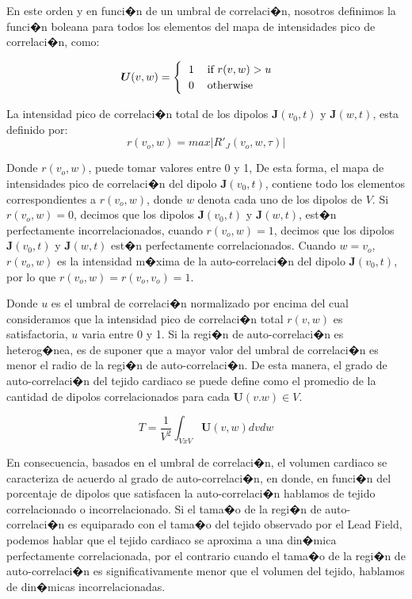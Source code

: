 En este orden y en funci�n de un umbral de correlaci�n, nosotros definimos la funci�n boleana para todos los elementos del mapa de intensidades pico de correlaci�n, como:
 
\begin{equation}
 \boldsymbol{U}(v,w)=
 \begin{cases}
    \begin{tabular}{ll}
        ${1}$ & if ${r}(v,w) > {u}$\\
        ${0}$ & otherwise
    \end{tabular}
 \end{cases}
\end{equation}

 La intensidad pico de correlaci�n total de los  dipolos  $\mathbf{J}(v_0,t)$ y $\mathbf{J}(w,t)$, esta definido por: 
\begin{equation}
{r}(v_o,w)  =max{|{R'_{J}}(v_o,w,\tau)|}
\end{equation}

Donde ${r}(v_o,w)$, puede tomar valores entre 0 y 1, De esta forma, el mapa de intensidades pico de correlaci�n del dipolo $\mathbf{J}(v_0,t)$, contiene  todo los elementos correspondientes  a  ${r}(v_o,w)$,  donde $w$ denota cada uno de los dipolos de $V$. Si ${r}(v_o,w)=0$, decimos que los dipolos  $\mathbf{J}(v_0,t)$ y $\mathbf{J}(w,t)$, est�n perfectamente  incorrelacionados, cuando  ${r}(v_o,w)=1$, decimos que los dipolos  $\mathbf{J}(v_0,t)$ y $\mathbf{J}(w,t)$ est�n perfectamente correlacionados. Cuando  $w = v_o$, ${r}(v_o,w)$ es la intensidad m�xima de la auto-correlaci�n del dipolo $\mathbf{J}(v_0,t)$, por lo que ${r}(v_o,w)={r}(v_o,v_o)=1$.




Donde $u$ es el umbral de correlaci�n  normalizado  por encima del cual  consideramos que la intensidad pico de correlaci�n total ${r}(v,w)$ es satisfactoria, $u$ varia entre 0 y 1. Si la regi�n de auto-correlaci�n es heterog�nea, es de suponer que a mayor valor del umbral de correlaci�n es menor el radio de la regi�n de auto-correlaci�n. De esta manera, el grado de auto-correlaci�n del tejido cardiaco  se puede define como el promedio de la cantidad de  dipolos  correlacionados  para cada $\mathbf{U}(v.w) \in V$. 

\begin{equation}
{T}=\frac{1}{V^2}\int_{VxV}{\mathbf{U}(v,w){dvdw}}
\end{equation}

En consecuencia, basados en el umbral de correlaci�n,  el volumen  cardiaco se
caracteriza de acuerdo al grado de auto-correlaci�n,  en donde, en funci�n del 
porcentaje de dipolos que satisfacen la auto-correlaci�n hablamos de  tejido 
correlacionado o incorrelacionado. Si el tama�o de  la regi�n de
auto-correlaci�n  es equiparado  con el tama�o del tejido observado por el Lead
Field,  podemos hablar que el tejido cardiaco se aproxima a una din�mica
perfectamente  correlacionada, por el contrario cuando  el  tama�o  de la regi�n
de auto-correlaci�n  es significativamente menor que el volumen del  tejido,
hablamos de din�micas incorrelacionadas.

